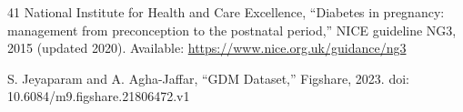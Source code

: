 \documentclass[conference]{IEEEtran}
\begin{document}
\begin{thebibliography}{41}
 National Institute for Health and Care Excellence, ``Diabetes in pregnancy: management from preconception to the postnatal period,'' NICE guideline NG3, 2015 (updated 2020). Available: \url{https://www.nice.org.uk/guidance/ng3}

 S. Jeyaparam and A. Agha-Jaffar, ``GDM Dataset,'' Figshare, 2023. doi: 10.6084/m9.figshare.21806472.v1

\end{thebibliography}
\end{document}
